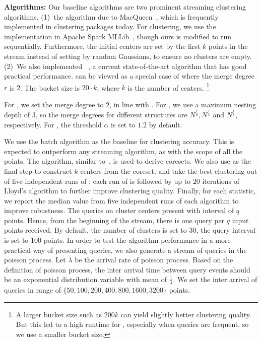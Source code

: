 \noindent\textbf{Algorithms:} Our baseline algorithms are two prominent streaming
clustering algorithms. (1)~the \seqkm algorithm due to
MacQueen~\cite{MacQueen67}, which is frequently implemented in clustering
packages today. For \seqkm clustering, we use the implementation in Apache Spark
MLLib~\cite{MBY+15}, though ours is modified to run sequentially. Furthermore,
the initial centers are set by the first $k$ points in the stream instead of
setting by random Gaussians, to ensure no clusters are empty. (2)~We also
implemented \skmpp~\cite{AMR+12}, a current state-of-the-art algorithm that has
good practical performance.  \skmpp can be viewed as a special case of \ct where
the merge degree $r$ is $2$. The bucket size is $20 \cdot k$, where $k$ is the number
of centers. \footnote{A larger bucket size such as $200k$ can yield slightly 
better clustering quality. But this led to a high runtime for \skmpp, 
especially when queries are frequent, so we use a smaller bucket size.}

For \cc, we set the merge degree to $2$, in line with \skmpp. For \rcc, we use a
maximum nesting depth of $3$, so the merge degrees for different structures are
$N^{\frac{1}{2}}, N^{\frac{1}{4}}$ and $N^{\frac{1}{8}}$, respectively. For
\hybrid, the threshold $\alpha$ is set to $1.2$ by default. 


We use the batch \kmpp algorithm as the baseline for clustering accuracy. This
is expected to outperform any streaming algorithm, as with the scope of all the points.  
The \kmpp algorithm, similar to~\cite{AMR+12,AJM09}, is used to derive coresets.  
We also use \kmpp as the final step to construct $k$ centers from the coreset, 
and take the best clustering out of five independent runs of \kmpp; 
each run of \kmpp is followed by up to $20$ iterations of Lloyd's algorithm to 
further improve clustering quality.
Finally, for each statistic, we report the median value from five independent runs 
of each algorithm to improve robustness. The queries on cluster centers present with interval of $q$ points. 
Hence, from the beginning of the stream, there is one query per $q$ input points received. 
By default, the number of clusters is set to $30$, the query interval is set to $100$ points.
In order to test the algorithm performance in a more practical way of presenting queries, 
we also generate a stream of queries in the poisson process. 
Let $\lambda$ be the arrival rate of poisson process. 
Based on the definition of poisson process, the inter arrival time between query events 
should be an exponential distribution variable with mean of $\frac{1}{\lambda}$. 
We set the inter arrival of queries in range of $\{50, 100, 200, 400, 800, 1600, 3200 \}$ points.

